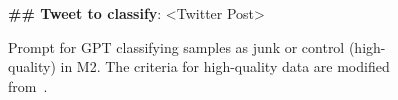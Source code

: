 \begin{figure}[t]
\begin{boxK}[colback=royalblue!5!white, colframe=royalblue!75!black, fontupper=\ttfamily\tiny]
        \textbf{\#\# Tweet to classify}: <Twitter Post>
    \end{boxK}

    \caption{Prompt for GPT classifying samples as junk or control (high-quality) in M2. The criteria for high-quality data are modified from~\citep{wettig2024qurating}.}
    \label{fig:gpt_score_prompt}
\end{figure}
